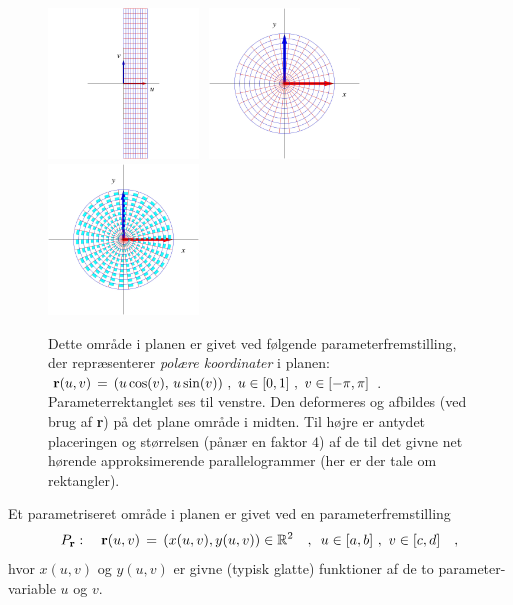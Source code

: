 \begin{figure}[ht]
\centerline{\includegraphics[height=40mm]{FIGS/plotPolarApp1}\,\,\,\,\qquad\includegraphics[height=40mm]{FIGS/plotPolarApp2}\,\,\,\,\qquad\includegraphics[height=40mm]{FIGS/plotPolarApp3}}
\begin{center}
\caption{\small{Dette område i planen  er givet
ved følgende parameterfremstilling, der
repræsenterer {\em{{polære koordinater}}} i planen:
${\bf r}(u, v) \, = \, (u\cos(v), \, u\sin(v) )
\,\,, \,\, u \in [0, 1 ]\,\, , \, \, v \in [-\pi,
\pi]\,$.
Parameterrektanglet ses til venstre. Den
deformeres og afbildes (ved brug af {\bf{r}}) på
det plane område i midten. Til højre er antydet
placeringen og størrelsen (pånær en faktor $4$)
af de til det givne net hørende approksimerende
parallelogrammer (her er der tale om rektangler).}}
\label{figPolar123}
\end{center}
\end{figure}



Et parametriseret {område i planen} er givet ved en
parameterfremstilling
\begin{equation}
\label{eqPr}
P_{\bf r}: \quad {\bf r}(u,v) \, = \, \left(x(u,v), y(u,v)\right) \in \mathbb{R}^2 \quad , \, \, \,  u \in [a,b] \, \,
, \, \,  v \in [c,d] \quad,
\end{equation}
hvor $x(u,v)$ og $y(u,v)$ er givne (typisk glatte) funktioner af de to parameter-variable $u$ og $v$.\\

